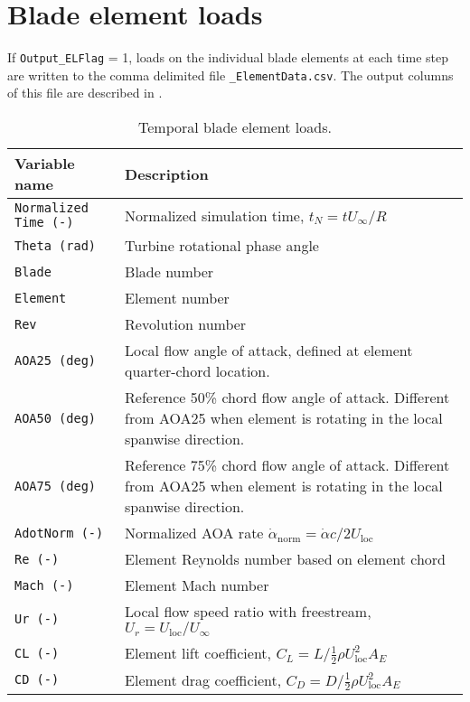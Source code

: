 \section{Blade element loads}
If \texttt{Output\_ELFlag} = 1, loads on the individual blade elements at each time step are written to the comma delimited file \texttt{\_ElementData.csv}. The output columns of this file are described in .

\begin{table}[!htbp]
\centering
\caption{Temporal blade element loads.}
\label{tbl:output_vars_blade}
\begin{tabular}{p{}p{}}
\toprule
Variable name & Description \\ \midrule
\texttt{Normalized Time (-)} & Normalized simulation time, $t_N=t U_\infty/R$ \\
\texttt{Theta (rad)}         & Turbine rotational phase angle \\
\texttt{Blade}               & Blade number \\
\texttt{Element}             & Element number \\
\texttt{Rev}                 & Revolution number \\
\texttt{AOA25 (deg)}         & Local flow angle of attack, defined at element quarter-chord location. \\
\texttt{AOA50 (deg)}         & Reference 50\% chord flow angle of attack. Different from AOA25 when element is rotating in the local spanwise direction. \\
\texttt{AOA75 (deg)}         & Reference 75\% chord flow angle of attack. Different from AOA25 when element is rotating in the local spanwise direction. \\
\texttt{AdotNorm (-)}        & Normalized AOA rate  $\dot{\alpha}_\textrm{norm} = \dot{\alpha} c / 2 U_\textrm{loc}$ \\ 
\texttt{Re (-)}              & Element Reynolds number based on element chord \\
\texttt{Mach (-)}            & Element Mach number \\
\texttt{Ur (-)}              & Local flow speed ratio with freestream, $U_r = U_\textrm{loc}/U_\infty$ \\ 
\texttt{CL (-)}              & Element lift coefficient, $C_L=L/{\frac{1}{2} \rho U_\textrm{loc}^2 A_E}$ \\
\texttt{CD (-)}              & Element drag coefficient, $C_D=D/{\frac{1}{2} \rho U_\textrm{loc}^2 A_E}$ \\

\end{tabular}
\end{table}
